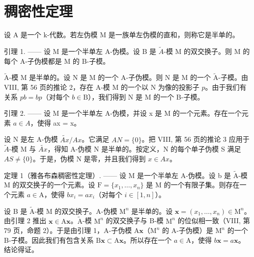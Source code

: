 \section{稠密性定理}

设 A 是一个 k-代数。若左伪模 M 是一族单左伪模的直和，则称它是半单的。

引理 1. —— 设 M 是一个半单左 A-伪模。设 B 是 \(\widetilde{A}\)-模 M 的双交换子。则 M 的每个 A-子伪模都是 M 的 B-子模。

\(\widetilde{\mathrm{A}}\)-模 M 是半单的。设 N 是 M 的一个 A-子伪模。则 N 是 M 的一个 \(\widetilde{\mathrm{A}}\)-子模。由 VIII, 第 56 页的推论 2，存在 A-模 M 的一个以 N 为像的投影子 \(p\)。由于我们有关系 \(pb = bp\)（对每个 \(b \in \mathrm{B}\)），我们得到 N 是 M 的一个 B-子模。

引理 2. —— 设 M 是一个半单左 A-伪模，并设 x 是 M 的一个元素。存在一个元素 \(a \in A\)，使得 ax = x。

设 N 是左 A-伪模 \(\widetilde{Ax}/Ax\)。它满足 \(AN = \{0\}\)。把 VIII, 第 56 页的推论 3 应用于 \(\widetilde{A}\)-模 M 与 \(\widetilde{Ax}\)，得知 A-伪模 N 是半单的。按定义，N 的每个单子伪模 S 满足 \(AS \neq \{0\}\)。于是，伪模 N 是零，并且我们得到 \(x \in Ax\)。

定理 1（雅各布森稠密性定理）. —— 设 M 是一个半单左 A-伪模。设 b 是 \(\widetilde{\mathrm{A}}\)-模 M 的双交换子的一个元素。设 \(\mathrm{F} = \{x_1, \ldots, x_n\}\) 是 M 的一个有限子集。则存在一个元素 \(a \in \mathrm{A}\)，使得 \(bx_i = ax_i\)（对每个 \(i \in [1, n]\)）。

设 B 是 \(\widetilde{\mathrm{A}}\)-模 M 的双交换子。A-伪模 \(\mathrm{M}^n\) 是半单的。设 \(\boldsymbol{x} = (x_1, \ldots, x_n) \in \mathrm{M}^n\)。由引理 2 推出 \(\boldsymbol{x} \in \mathrm{A}\boldsymbol{x}\)。\(\widetilde{\mathrm{A}}\)-模 \(\mathrm{M}^n\) 的双交换子与 B-模 \(\mathrm{M}^n\) 的位似相一致（VIII, 第 79 页，命题 2）。于是由引理 1，A-子伪模 \(\mathrm{A}\boldsymbol{x}\)（\(\mathrm{M}^n\) 的 A-子伪模）是 \(\mathrm{M}^n\) 的一个 B-子模。因此我们有包含关系 \(\mathrm{B}\boldsymbol{x} \subset \mathrm{A}\boldsymbol{x}\)。所以存在一个 \(a \in \mathrm{A}\)，使得 \(b\boldsymbol{x} = a\boldsymbol{x}\)。结论得证。
\relax{}
